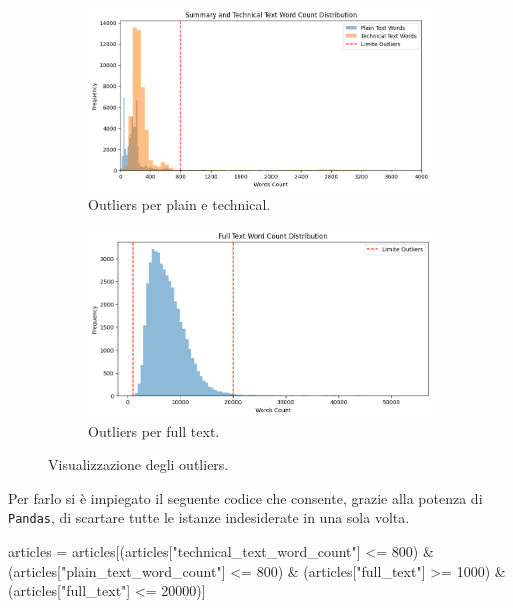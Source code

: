 \documentclass[12pt,a4paper,twoside,openright]{book}
\begin{document}
\begin{figure}
    \centering
    \begin{subfigure}[b]{0.89\textwidth}
        \includegraphics[width=\textwidth]{images/hist_wc_outliers.png}
        \caption{Outliers per plain e technical.}
        \label{fig:hist_tech_plain_word_outliers}
    \end{subfigure}
\quad
    \begin{subfigure}[b]{0.85\textwidth}
        \includegraphics[width=\textwidth]{images/hist_wc_outliers_full.png}
        \caption{Outliers per full text.}
        \label{fig:hist_full_word_outliers}
    \end{subfigure}
    \caption{Visualizzazione degli outliers.}
\end{figure}

Per farlo si è impiegato il seguente codice che consente, grazie alla potenza di \texttt{Pandas}, di scartare tutte le istanze indesiderate in una sola volta.

\begin{python}[caption={Script per rimozione outliers per numero di parole.}, label={lst:py-rimuovi-outliers}]
articles = articles[(articles["technical_text_word_count"] <= 800) & 
                     (articles["plain_text_word_count"] <= 800) &
                     (articles["full_text"] >= 1000) &
                     (articles["full_text"] <= 20000)]
\end{python}
\end{document}
